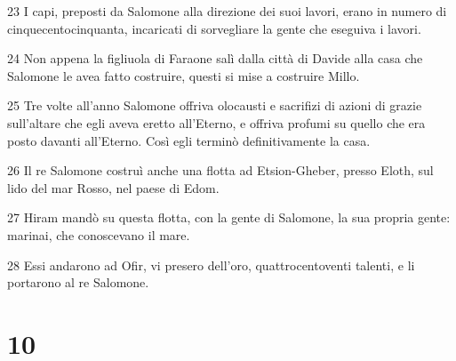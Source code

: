 \par 23 I capi, preposti da Salomone alla direzione dei suoi lavori, erano in numero di cinquecentocinquanta, incaricati di sorvegliare la gente che eseguiva i lavori.
\par 24 Non appena la figliuola di Faraone salì dalla città di Davide alla casa che Salomone le avea fatto costruire, questi si mise a costruire Millo.
\par 25 Tre volte all'anno Salomone offriva olocausti e sacrifizi di azioni di grazie sull'altare che egli aveva eretto all'Eterno, e offriva profumi su quello che era posto davanti all'Eterno. Così egli terminò definitivamente la casa.
\par 26 Il re Salomone costruì anche una flotta ad Etsion-Gheber, presso Eloth, sul lido del mar Rosso, nel paese di Edom.
\par 27 Hiram mandò su questa flotta, con la gente di Salomone, la sua propria gente: marinai, che conoscevano il mare.
\par 28 Essi andarono ad Ofir, vi presero dell'oro, quattrocentoventi talenti, e li portarono al re Salomone.

\chapter{10}

